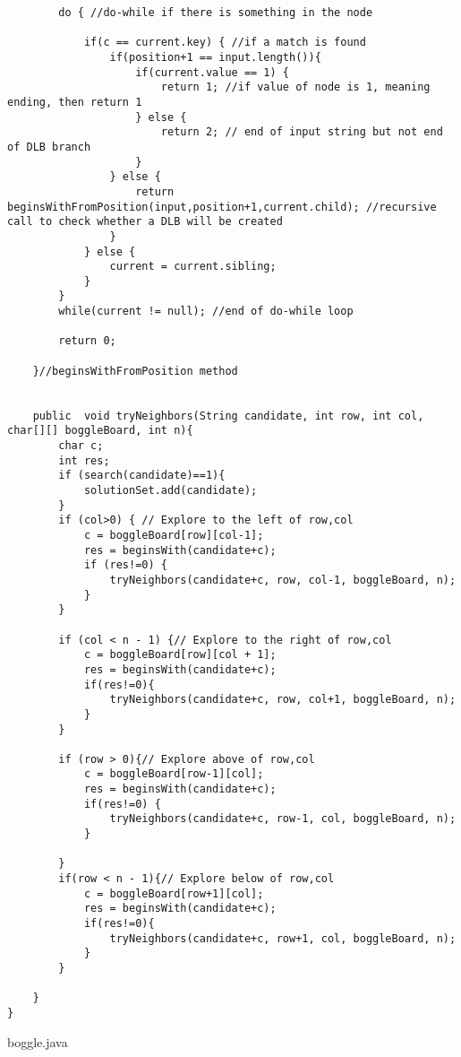 \documentclass{article}
\begin{document}
\begin{lstlisting}
		do { //do-while if there is something in the node

			if(c == current.key) { //if a match is found
				if(position+1 == input.length()){
					if(current.value == 1) {
						return 1; //if value of node is 1, meaning ending, then return 1 
					} else {
						return 2; // end of input string but not end of DLB branch
					}
				} else {
					return beginsWithFromPosition(input,position+1,current.child); //recursive call to check whether a DLB will be created
				}
			} else {
				current = current.sibling;
			}
		}
		while(current != null); //end of do-while loop

		return 0; 

	}//beginsWithFromPosition method


	public  void tryNeighbors(String candidate, int row, int col, char[][] boggleBoard, int n){
		char c;
		int res;
		if (search(candidate)==1){
			solutionSet.add(candidate);
		}
		if (col>0) { // Explore to the left of row,col
			c = boggleBoard[row][col-1];
			res = beginsWith(candidate+c);
			if (res!=0) {
				tryNeighbors(candidate+c, row, col-1, boggleBoard, n);
			}
		}
		
		if (col < n - 1) {// Explore to the right of row,col
			c = boggleBoard[row][col + 1];
			res = beginsWith(candidate+c);
			if(res!=0){
				tryNeighbors(candidate+c, row, col+1, boggleBoard, n);
			}
		}
			
		if (row > 0){// Explore above of row,col
			c = boggleBoard[row-1][col];
			res = beginsWith(candidate+c);
			if(res!=0) {
				tryNeighbors(candidate+c, row-1, col, boggleBoard, n);
			}

		}
		if(row < n - 1){// Explore below of row,col
			c = boggleBoard[row+1][col];
			res = beginsWith(candidate+c);
			if(res!=0){
				tryNeighbors(candidate+c, row+1, col, boggleBoard, n);
			}
		}

	}
}
\end{lstlisting}
boggle.java
\end{document}
